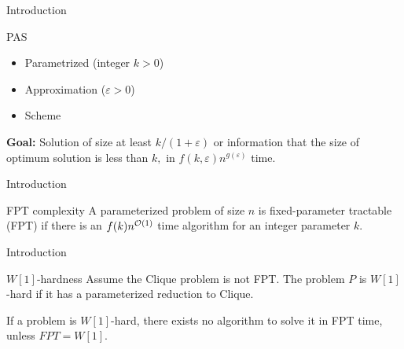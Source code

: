 \documentclass[handout,usenames,dvipsnames]{beamer}
\begin{document}
\begin{frame}{Introduction}
    \begin{block}{PAS}
        \begin{itemize}
            \item Parametrized (integer $k > 0$)
            \pause
            \item Approximation ($\varepsilon > 0$)
            \pause
            \item Scheme
        \end{itemize}
    \end{block}
    \pause
    {\color{PineGreen} \textbf{Goal:}} Solution of size at least $k / (1 + \varepsilon)$ or information that the size of optimum solution is less than $k,$ in $f(k, \varepsilon) n^{g(\varepsilon)}$ time.
\end{frame}



\begin{frame}{Introduction}
    \begin{block}{FPT complexity}
        A parameterized problem of size $n$ is fixed-parameter tractable (FPT) if there is an $f(k)n^{\mathcal{O}(1)}$ time algorithm for an integer parameter $k$.
    \end{block}
\end{frame}

\begin{frame}{Introduction}
    \begin{block}{$W[1]$-hardness}
        Assume the Clique problem is not FPT. The problem $P$ is $W[1]$-hard if it has a parameterized reduction to Clique.
    \end{block}
    
    If a problem is $W[1]$-hard, there exists no algorithm to solve it in FPT time, unless $FPT = W[1].$
\end{frame}
\end{document}
